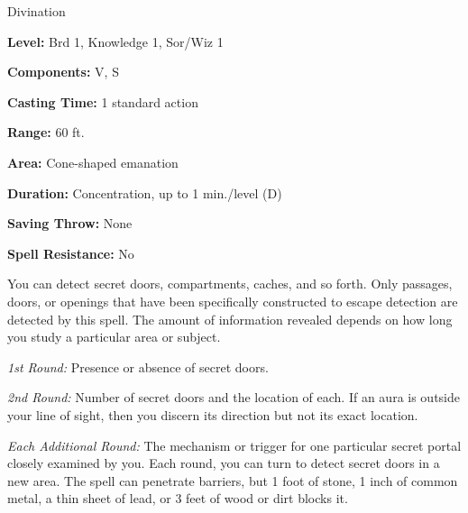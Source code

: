
Divination

\textbf{Level:} Brd 1, Knowledge 1, Sor/Wiz 1

\textbf{Components:} V, S

\textbf{Casting Time:} 1 standard action

\textbf{Range:} 60 ft.

\textbf{Area:} Cone-shaped emanation

\textbf{Duration:} Concentration, up to 1 min./level (D)

\textbf{Saving Throw:} None

\textbf{Spell Resistance:} No

You can detect secret doors, compartments, caches, and so forth. Only passages, 
doors, or openings that have been specifically constructed to escape detection 
are detected by this spell. The amount of information revealed depends on how long 
you study a particular area or subject.

\textit{1st Round:} Presence or absence of secret doors.

\textit{2nd Round:} Number of secret doors and the location of each. If an aura 
is outside your line of sight, then you discern its direction but not its exact 
location.

\textit{Each Additional Round:} The mechanism or trigger for one particular secret 
portal closely examined by you. Each round, you can turn to detect secret doors 
in a new area. The spell can penetrate barriers, but 1 foot of stone, 1 inch of 
common metal, a thin sheet of lead, or 3 feet of wood or dirt blocks it.

